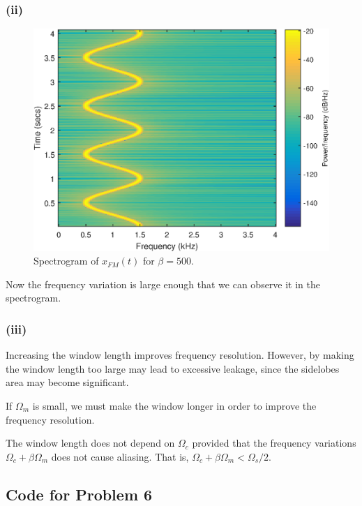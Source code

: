 \documentclass{article}
\begin{document}
\subsubsection{(ii)}
\FloatBarrier
\begin{figure}[h!]
	\centering
	\includegraphics[scale=0.7]{figs/hw6_fm_eii.eps}
	\caption{Spectrogram of $x_{FM}(t)$ for $\beta = 500$.}
\end{figure}
\FloatBarrier

Now the frequency variation is large enough that we can observe it in the spectrogram. 

\subsubsection{(iii)}

Increasing the window length improves frequency resolution. However, by making the window length too large may lead to excessive leakage, since the sidelobes area may become significant.

If $\Omega_m$ is small, we must make the window longer in order to improve the frequency resolution. 

The window length does not depend on $\Omega_c$ provided that the frequency variations $\Omega_c + \beta\Omega_m$ does not cause aliasing. That is, $\Omega_c + \beta\Omega_m < \Omega_s/2$.

\subsection{Code for Problem 6}

\end{document}
